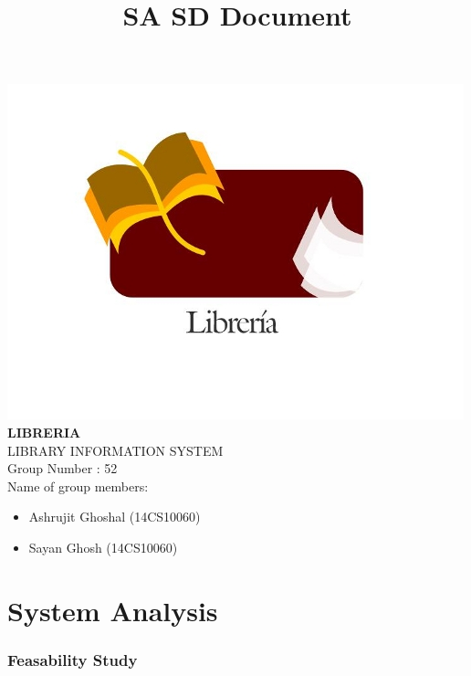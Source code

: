 \documentclass[a4paper]{article}
\title{\textbf{ SA SD Document}}
\author{}
\date{}
\begin{document}
\maketitle
\begin{center}
\includegraphics[scale=0.6]{images/logoLIS_modified.jpg}
\\
\textbf{LIBRERIA}\\
LIBRARY INFORMATION SYSTEM\\
Group Number : 52\\
 Name of group members: \\
\begin{itemize}
\item \begin{center}Ashrujit Ghoshal (14CS10060)\end{center}
\item \begin{center}Sayan Ghosh (14CS10060)\end{center}
\end{itemize}

\end{center}
\newpage
\hypertarget{toc}{}
\tableofcontents
\newpage
\part{System Analysis}
\section{Feasability Study}
\end{document}
